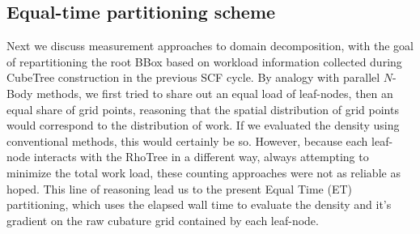 \commentoutA{\documentclass[prb,aps,twocolumn,twocolumngrid]{revtex4}}
\begin{document}
\subsection{Equal-time partitioning scheme}
\label{subsec:equal-time}

Next we discuss measurement approaches to domain decomposition, with the goal of 
repartitioning the root BBox based on workload information collected during 
CubeTree construction in the previous SCF cycle.  By analogy with parallel $N$-Body
methods\cite{JPilkington96,warren:92_article,Grama94_article,Warren95b,Singh93,Singh_95v27,Grama_98v24},
we first tried to share out an equal load of leaf-nodes, then an equal share of grid points, 
reasoning that the spatial distribution of grid points would correspond to the distribution 
of work.  If we evaluated the density using conventional methods, this would certainly be so.
However, because each leaf-node interacts with the RhoTree in a different way, always attempting 
to minimize the total work load, these counting approaches were not as reliable as hoped.  
This line of reasoning lead us to the present Equal Time (ET) partitioning, which uses the elapsed 
wall time to evaluate the density and it's gradient on the raw cubature grid contained by each leaf-node.
\end{document}

